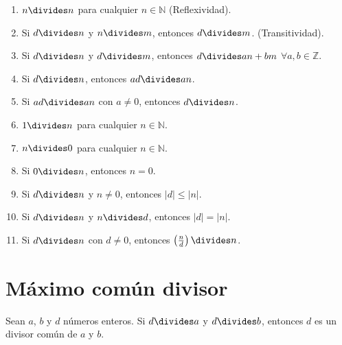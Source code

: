 \documentclass[oneside,a5paper]{memoir}
\begin{document}
\begin{enumerate}[font={\bfseries},label={\arabic*)}]

\item\label{prop:1} $n\divides n$ para cualquier $n\in\mathbb{N}$ (Reflexividad).

\item\label{prop:2} Si $d\divides n$ y $n\divides m$, entonces $d\divides m$. (Transitividad).

\item\label{prop:3} Si $d\divides n$ y $d\divides m$, entonces $d\divides an+bm$ $\forall a,b\in\mathbb{Z}$.

\item\label{prop:4} Si $d\divides n$, entonces $ad\divides an$.

\item\label{prop:5} Si $ad\divides an$ con $a\neq0$, entonces $d\divides n$.

\item\label{prop:6} $1\divides n$ para cualquier $n\in\mathbb{N}$.

\item\label{prop:7} $n\divides 0$ para cualquier $n\in\mathbb{N}$.

\item\label{prop:8} Si $0\divides n$, entonces $n=0$.

\item\label{prop:9} Si $d\divides n$ y $n\neq0$, entonces $|d|\leq|n|$.

\item\label{prop:10} Si $d\divides n$ y $n\divides d$, entonces $|d|=|n|$.

\item\label{prop:11} Si $d\divides n$ con $d\neq0$, entonces $\left(\frac{n}{d}\right)\divides n$.

\end{enumerate}

\section{Máximo común divisor}

\begin{definition}\label{def:1.2}

Sean $a$, $b$ y $d$ números enteros. Si $d\divides a$ y $d\divides b$, entonces $d$ es un divisor común de $a$ y $b$.

\end{definition}
\end{document}
